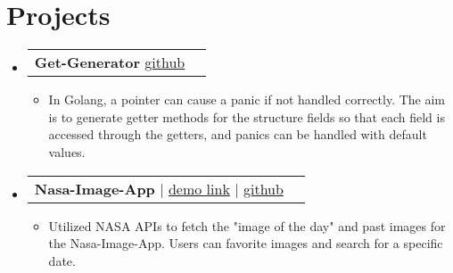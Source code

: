\documentclass[letterpaper,11pt]{article}
\makeatletter
\newcommand{\resumeItem}[1]{
  \item\small{
    {#1 \vspace{-2pt}}
  }
}
\newcommand{\resumeProjectHeading}[2]{
    \item
    \begin{tabular*}{1.001\textwidth}{l@{\extracolsep{\fill}}r}
      \small#1 & \textbf{\small #2}\\
    \end{tabular*}\vspace{-7pt}
}
\newcommand{\resumeSubHeadingListStart}{\begin{itemize}[leftmargin=0.0in, label={}]}
\newcommand{\resumeSubHeadingListEnd}{\end{itemize}}
\newcommand{\resumeItemListStart}{\begin{itemize}}
\newcommand{\resumeItemListEnd}{\end{itemize}\vspace{-5pt}}
\makeatother
\begin{document}


\section{Projects}
    \vspace{-6pt}
    \resumeSubHeadingListStart
    \resumeProjectHeading
          {\textbf{Get-Generator} \hfill \href{https://github.com/abba5/get-generator}{github}}{}
          \resumeItemListStart
           \vspace{5pt}
            \resumeItem{ In Golang, a pointer can cause a panic if not handled correctly. The aim is to generate getter methods for the structure fields so that each field is accessed through the getters, and panics can be handled with default values.}
          \resumeItemListEnd
          \vspace{-12pt}
    \resumeProjectHeading
          {\textbf{Nasa-Image-App} $|$ \hfill \href{https://nasa-app-images.netlify.app/}{demo link} $|$   \href{https://github.com/abba5/nasa-image-app}{github}}{}
          \resumeItemListStart
            \vspace{5pt}
            \resumeItem{Utilized NASA APIs to fetch the "image of the day" and past images for the Nasa-Image-App. Users can favorite images and search for a specific date.}
          \resumeItemListEnd
          \vspace{-12pt}
    \resumeSubHeadingListEnd
\vspace{-3pt}
\end{document}
